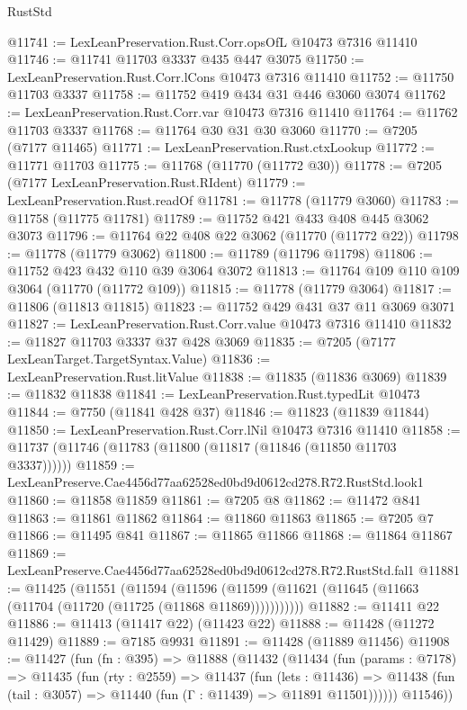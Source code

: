 \begin{lexlean}{RustStd}
\begin{coremodule}
@11741 := LexLeanPreservation.Rust.Corr.opsOfL @10473 @7316 @11410
@11746 := @11741 @11703 @3337 @435 @447 @3075
@11750 := LexLeanPreservation.Rust.Corr.lCons @10473 @7316 @11410
@11752 := @11750 @11703 @3337
@11758 := @11752 @419 @434 @31 @446 @3060 @3074
@11762 := LexLeanPreservation.Rust.Corr.var @10473 @7316 @11410
@11764 := @11762 @11703 @3337
@11768 := @11764 @30 @31 @30 @3060
@11770 := @7205 (@7177 @11465)
@11771 := LexLeanPreservation.Rust.ctxLookup
@11772 := @11771 @11703
@11775 := @11768 (@11770 (@11772 @30))
@11778 := @7205 (@7177 LexLeanPreservation.Rust.RIdent)
@11779 := LexLeanPreservation.Rust.readOf
@11781 := @11778 (@11779 @3060)
@11783 := @11758 (@11775 @11781)
@11789 := @11752 @421 @433 @408 @445 @3062 @3073
@11796 := @11764 @22 @408 @22 @3062 (@11770 (@11772 @22))
@11798 := @11778 (@11779 @3062)
@11800 := @11789 (@11796 @11798)
@11806 := @11752 @423 @432 @110 @39 @3064 @3072
@11813 := @11764 @109 @110 @109 @3064 (@11770 (@11772 @109))
@11815 := @11778 (@11779 @3064)
@11817 := @11806 (@11813 @11815)
@11823 := @11752 @429 @431 @37 @11 @3069 @3071
@11827 := LexLeanPreservation.Rust.Corr.value @10473 @7316 @11410
@11832 := @11827 @11703 @3337 @37 @428 @3069
@11835 := @7205 (@7177 LexLeanTarget.TargetSyntax.Value)
@11836 := LexLeanPreservation.Rust.litValue
@11838 := @11835 (@11836 @3069)
@11839 := @11832 @11838
@11841 := LexLeanPreservation.Rust.typedLit @10473
@11844 := @7750 (@11841 @428 @37)
@11846 := @11823 (@11839 @11844)
@11850 := LexLeanPreservation.Rust.Corr.lNil @10473 @7316 @11410
@11858 := @11737 (@11746 (@11783 (@11800 (@11817 (@11846 (@11850 @11703 @3337))))))
@11859 := LexLeanPreserve.Cae4456d77aa62528ed0bd9d0612cd278.R72.RustStd.look1
@11860 := @11858 @11859
@11861 := @7205 @8
@11862 := @11472 @841
@11863 := @11861 @11862
@11864 := @11860 @11863
@11865 := @7205 @7
@11866 := @11495 @841
@11867 := @11865 @11866
@11868 := @11864 @11867
@11869 := LexLeanPreserve.Cae4456d77aa62528ed0bd9d0612cd278.R72.RustStd.fal1
@11881 := @11425
    (@11551
      (@11594
        (@11596 (@11599 (@11621 (@11645 (@11663 (@11704 (@11720 (@11725 (@11868 @11869)))))))))))
@11882 := @11411 @22
@11886 := @11413 (@11417 @22) (@11423 @22)
@11888 := @11428 (@11272 @11429)
@11889 := @7185 @9931
@11891 := @11428 (@11889 @11456)
@11908 := @11427
    (fun (fn : @395) =>
    @11888
      (@11432
        (@11434
          (fun (params : @7178) =>
          @11435
            (fun (rty : @2559) =>
            @11437
              (fun (lets : @11436) =>
              @11438 (fun (tail : @3057) => @11440 (fun (Γ : @11439) => @11891 @11501))))))
        @11546))

\end{coremodule}
\end{lexlean}
